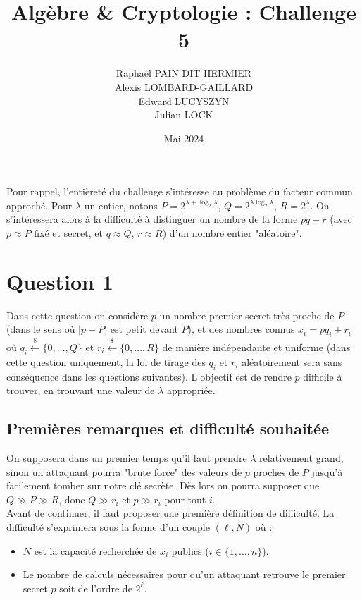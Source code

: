 \documentclass{article}
\title{Algèbre \& Cryptologie : Challenge 5}
\author{Raphaël PAIN DIT HERMIER\\
Alexis LOMBARD-GAILLARD\\
Edward LUCYSZYN\\
Julian LOCK}
\date{Mai 2024}
\begin{document}


\tableofcontents

\newpage

Pour rappel, l'entièreté du challenge s'intéresse au problème du facteur commun approché. Pour \(\lambda\) un entier, notons \(P = 2^{\lambda + \log_2 \lambda}\), \(Q = 2^{\lambda \log_2 \lambda}\), \(R = 2^\lambda\). On s'intéressera alors à la difficulté à distinguer un nombre de la forme \(pq + r\) (avec \(p \approx P\) fixé et secret, et \(q \approx Q\), \(r \approx R\)) d’un nombre entier "aléatoire".

\section{Question 1}

Dans cette question on considère $p$ un nombre premier secret très proche de $P$ (dans le sens où $|p-P|$ est petit devant $P$), et des nombres connus $x_i = pq_i + r_i$ où $q_i\xleftarrow{\$}\{0,\dots,Q\}$ et $r_i\xleftarrow{\$}\{0,\dots,R\}$ de manière indépendante et uniforme (dans cette question uniquement, la loi de tirage des $q_i$ et $r_i$ aléatoirement sera sans conséquence dans les questions suivantes). L'objectif est de rendre $p$ difficile à trouver, en trouvant une valeur de $\lambda$ appropriée.\\

\subsection{Premières remarques et difficulté souhaitée}

On supposera dans un premier temps qu'il faut prendre $\lambda$ relativement grand, sinon un attaquant pourra "brute force" des valeurs de $p$ proches de $P$ jusqu'à facilement tomber sur notre clé secrète. Dès lors on pourra supposer que $Q\gg P \gg R$, donc $Q \gg r_i$ et $p\gg r_i$ pour tout $i$.\\

Avant de continuer, il faut proposer une première définition de difficulté. La difficulté s'exprimera sous la forme d'un couple $(\ell,N)$ où :
\begin{itemize}
    \item $N$ est la capacité recherchée de $x_i$ publics ($i \in \{1,\dots,n\}$).
    \item Le nombre de calculs nécessaires pour qu'un attaquant retrouve le premier secret $p$ soit de l'ordre de $2^\ell$.
\end{itemize}
\end{document}
